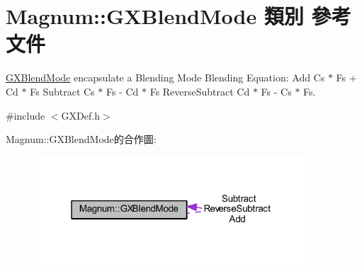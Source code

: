 \hypertarget{class_magnum_1_1_g_x_blend_mode}{}\section{Magnum\+:\+:G\+X\+Blend\+Mode 類別 參考文件}
\label{class_magnum_1_1_g_x_blend_mode}


\hyperlink{class_magnum_1_1_g_x_blend_mode}{G\+X\+Blend\+Mode} encapsulate a Blending Mode Blending Equation\+: Add Cs $\ast$ Fs + Cd $\ast$ Fs Subtract Cs $\ast$ Fs -\/ Cd $\ast$ Fs Reverse\+Subtract Cd $\ast$ Fs -\/ Cs $\ast$ Fs.  




{\ttfamily \#include $<$G\+X\+Def.\+h$>$}



Magnum\+:\+:G\+X\+Blend\+Mode的合作圖\+:\nopagebreak
\begin{figure}[H]
\begin{center}
\leavevmode
\includegraphics[width=292pt]{class_magnum_1_1_g_x_blend_mode__coll__graph}
\end{center}
\end{figure}
